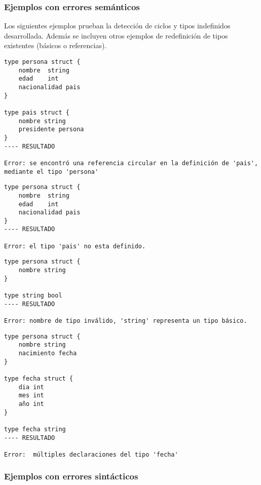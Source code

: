 \subsubsection{Ejemplos con errores semánticos}

    Los siguientes ejemplos prueban la detección de ciclos y tipos indefinidos desarrollada.
    Además se incluyen otros ejemplos de redefinición de tipos existentes (básicos o referencias).

\begin{lstlisting}[caption=Ejemplo con ciclo de definiciones que parte del tipo principal.]
type persona struct {
    nombre  string
    edad    int
    nacionalidad pais
}

type pais struct {
    nombre string
    presidente persona
}
---- RESULTADO

Error: se encontró una referencia circular en la definición de 'pais', mediante el tipo 'persona'
\end{lstlisting}

\begin{lstlisting}[caption=Ejemplo con uso de tipo no definido.]
type persona struct {
    nombre  string
    edad    int
    nacionalidad pais
}
---- RESULTADO

Error: el tipo 'pais' no esta definido.
\end{lstlisting}

\begin{lstlisting}[caption=Ejemplo con redefinición de tipo básico.]
type persona struct {
    nombre string
}

type string bool
---- RESULTADO

Error: nombre de tipo inválido, 'string' representa un tipo básico.
\end{lstlisting}

\begin{lstlisting}[caption=Ejemplo con múltiples declaraciones para el mismo tipo.]
type persona struct {
    nombre string
    nacimiento fecha
}

type fecha struct {
    dia int
    mes int
    año int
}

type fecha string
---- RESULTADO

Error:  múltiples declaraciones del tipo 'fecha'
\end{lstlisting}

\subsubsection{Ejemplos con errores sintácticos}

